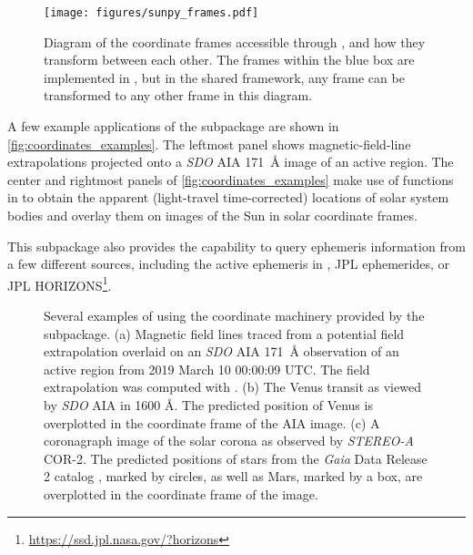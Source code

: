 \begin{figure}
    \centering
    \texttt{[image: figures/sunpy\_frames.pdf]}
    \caption{Diagram of the coordinate frames accessible through , and how they transform between each other.
    The frames within the blue box are implemented in , but in the shared framework, any frame can be transformed to any other frame in this diagram.}
    \label{fig:transform_graph}
\end{figure}

A few example applications of the  subpackage are shown in \autoref{fig:coordinates_examples}.
The leftmost panel shows magnetic-field-line extrapolations projected onto a \textit{SDO} AIA 171~\AA{} image of an active region.
The center and rightmost panels of \autoref{fig:coordinates_examples} make use of functions in  to obtain the apparent (light-travel time-corrected) locations of solar system bodies and overlay them on images of the Sun in solar coordinate frames.

This subpackage also provides the capability to query ephemeris information from a few different sources, including the active ephemeris in , JPL ephemerides, or JPL HORIZONS\footnote{\url{https://ssd.jpl.nasa.gov/?horizons}}.

\begin{figure}
    \caption{Several examples of using the coordinate machinery provided by the  subpackage.
    (a) Magnetic field lines traced from a potential field extrapolation overlaid on an \textit{SDO} AIA 171~\AA{} observation of an active region from 2019 March 10 00:00:09 UTC.
    The field extrapolation was computed with  \citep{david_stansby_2019_3237053}.
    (b) The Venus transit as viewed by \textit{SDO} AIA in 1600 \AA. The predicted position of Venus is overplotted in the coordinate frame of the AIA image.
    (c) A coronagraph image of the solar corona as observed by \textit{STEREO-A} COR-2. The predicted positions of stars from the \textit{Gaia} \citep{gaia_collaboration_gaia_2016} Data Release 2 catalog \citep{gaia_collaboration_gaia_2018}, marked by circles, as well as Mars, marked by a box, are overplotted in the coordinate frame of the image.}
    \label{fig:coordinates_examples}
\end{figure}
